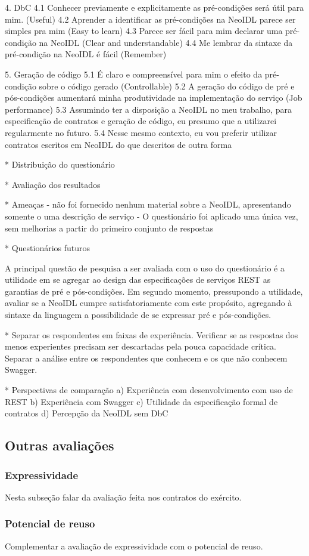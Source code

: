 4. DbC
4.1 Conhecer previamente e explicitamente as pré-condições será útil para mim.
(Useful)
4.2 Aprender a identificar as pré-condições na NeoIDL parece ser simples pra mim
(Easy to learn)
4.3 Parece ser fácil para mim declarar uma pré-condição na NeoIDL
(Clear and understandable)
4.4 Me lembrar da sintaxe da pré-condição na NeoIDL é fácil  (Remember)

5. Geração de código
5.1 É claro e compreensível para mim o efeito da pré-condição sobre o código
gerado  (Controllable)
5.2 A geração do código de pré e pós-condições aumentará minha produtividade na
implementação do serviço (Job performance)
5.3 Assumindo ter a disposição a NeoIDL no meu trabalho, para especificação de
contratos e geração de código, eu presumo que a utilizarei regularmente no futuro.
5.4 Nesse mesmo contexto, eu vou preferir utilizar contratos escritos em NeoIDL
do que descritos de outra forma



* Distribuição do questionário

* Avaliação dos resultados

* Ameaças
- não foi fornecido nenhum material sobre a NeoIDL, apresentando somente o uma
descrição de serviço
- O questionário foi aplicado uma única vez, sem melhorias a partir do primeiro
conjunto de respostas


* Questionários futuros

A principal questão de pesquisa a ser avaliada com o uso do questionário é a utilidade em se agregar ao design das especificações de serviços REST as garantias de pré e
pós-condições. Em segundo momento, pressupondo a utilidade, avaliar se a NeoIDL
cumpre satisfatoriamente com este propósito, agregando à sintaxe da linguagem
a possibilidade de se expressar pré e pós-condições.

* Separar os respondentes em faixas de experiência. Verificar se as respostas
dos menos experientes precisam ser descartadas pela pouca capacidade crítica.
Separar a análise entre os respondentes que conhecem e os que não conhecem
Swagger.

* Perspectivas de comparação
a) Experiência com desenvolvimento com uso de REST
b) Experiência com Swagger
c) Utilidade da especificação formal de contratos
d) Percepção da NeoIDL sem DbC





\subsection{Outras avaliações}
\vspace{-6mm}

\subsubsection{Expressividade}
\vspace{-6mm}

Nesta subseção falar da avaliação feita nos contratos do exército.

\subsubsection{Potencial de reuso}

Complementar a avaliação de expressividade com o potencial de reuso.